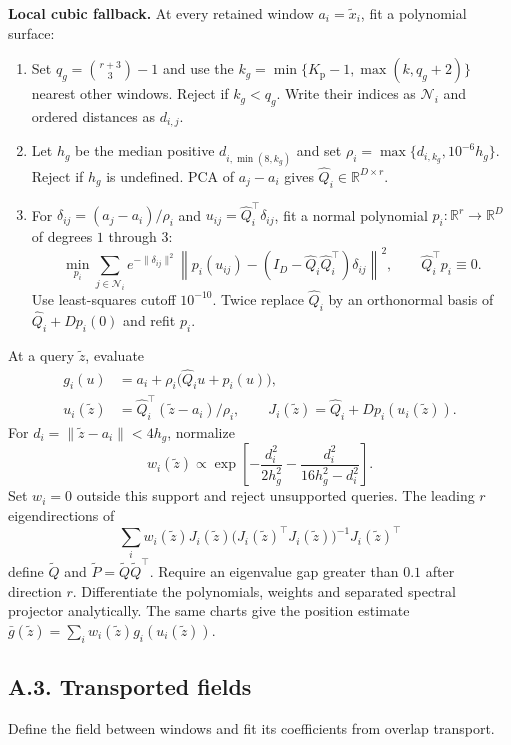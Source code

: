\documentclass[11pt,a4paper]{article}
\newcommand{\R}{\mathbb R}
\begin{document}
\textbf{Local cubic fallback.}
At every retained window $a_i=\widetilde x_i$, fit a polynomial surface:
\begin{enumerate}
\setlength{\itemsep}{1pt}
\item Set $q_g=\binom{r+3}{3}-1$ and use the
$k_g=\min\{K_{\mathrm p}-1,\max(k,q_g+2)\}$ nearest other windows.
Reject if $k_g<q_g$. Write their indices as $\mathcal N_i$ and ordered
distances as $d_{i,j}$.
\item Let $h_g$ be the median positive $d_{i,\min(8,k_g)}$ and set
$\rho_i=\max\{d_{i,k_g},10^{-6}h_g\}$. Reject if $h_g$ is undefined.
PCA of $a_j-a_i$ gives $\widehat Q_i\in\R^{D\times r}$.
\item For $\delta_{ij}=(a_j-a_i)/\rho_i$ and
$u_{ij}=\widehat Q_i^\top\delta_{ij}$, fit a normal polynomial
$p_i:\R^r\to\R^D$ of degrees $1$ through $3$:
\[
\min_{p_i}\sum_{j\in\mathcal N_i}e^{-\|\delta_{ij}\|^2}
\left\|p_i(u_{ij})-
(I_D-\widehat Q_i\widehat Q_i^\top)\delta_{ij}\right\|^2,
\qquad \widehat Q_i^\top p_i\equiv0.
\]
Use least-squares cutoff $10^{-10}$. Twice replace $\widehat Q_i$ by
an orthonormal basis of $\widehat Q_i+Dp_i(0)$ and refit $p_i$.
\end{enumerate}
At a query $\widetilde z$, evaluate
\[
\begin{aligned}
g_i(u)&=a_i+\rho_i\bigl(\widehat Q_i u+p_i(u)\bigr),\\
u_i(\widetilde z)&=\widehat Q_i^\top(\widetilde z-a_i)/\rho_i,
\qquad J_i(\widetilde z)=\widehat Q_i+Dp_i(u_i(\widetilde z)).
\end{aligned}
\]
For $d_i=\|\widetilde z-a_i\|<4h_g$, normalize
\[
w_i(\widetilde z)\propto
\exp\!\left[-\frac{d_i^2}{2h_g^2}
-\frac{d_i^2}{16h_g^2-d_i^2}\right].
\]
Set $w_i=0$ outside this support and reject unsupported queries.
The leading $r$ eigendirections of
\[
\sum_i w_i(\widetilde z)J_i(\widetilde z)
\bigl(J_i(\widetilde z)^\top J_i(\widetilde z)\bigr)^{-1}
J_i(\widetilde z)^\top
\]
define $\widetilde Q$ and $\widetilde P=\widetilde Q\widetilde Q^\top$.
Require an eigenvalue gap greater than $0.1$ after direction $r$.
Differentiate the polynomials, weights and separated spectral projector
analytically. The same charts give the position estimate
$\bar g(\widetilde z)=\sum_iw_i(\widetilde z)g_i(u_i(\widetilde z))$.

\subsection*{A.3. Transported fields}
\label{app:field-model}
Define the field between windows and fit its coefficients from overlap transport.
\end{document}
